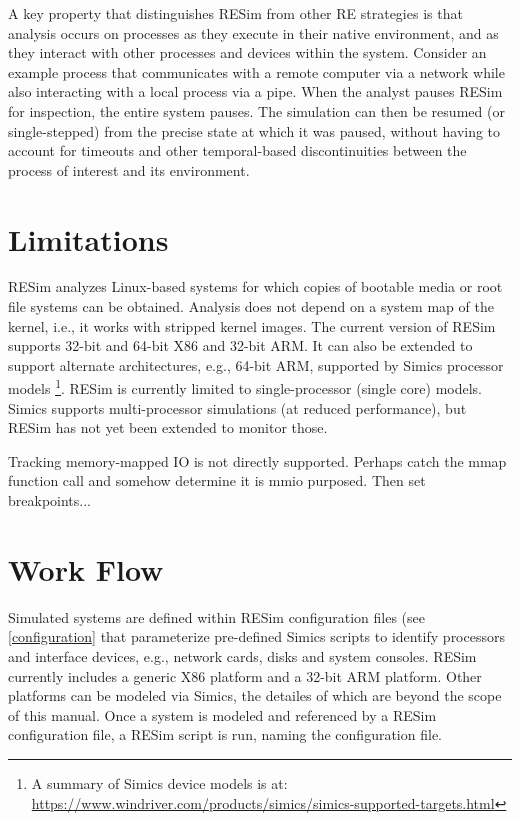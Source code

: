 \documentclass[titlepage]{article}
\begin{document}
A key property that distinguishes RESim from other RE strategies is that analysis occurs on processes as they execute in their native environment, and as they interact with other processes and devices within the system.  Consider an example process that communicates with a remote computer via a network while also interacting with a local process via a pipe.  When the analyst pauses RESim for inspection, the entire system pauses.  The simulation can then be resumed (or single-stepped) from the precise state at which it was paused, without having to account for timeouts and other temporal-based discontinuities between the process of interest and its environment.

\section{Limitations}
RESim analyzes Linux-based systems for which copies of bootable media or root file systems can be obtained.  Analysis does not depend on a system map of the kernel, i.e., it works with stripped kernel images.  The current version of RESim supports 32-bit and 64-bit X86 and 32-bit ARM.  It can also be 
extended to support alternate architectures, e.g., 64-bit ARM, supported by Simics processor models \footnote{A summary of Simics device models is at: \url{https://www.windriver.com/products/simics/simics-supported-targets.html}}.  RESim is currently limited to single-processor (single core) models.  Simics supports
multi-processor simulations (at reduced performance), but RESim has not yet been extended to monitor those.

Tracking memory-mapped IO is not directly supported.  Perhaps catch the mmap function call and somehow determine it is mmio purposed.  Then
set breakpoints...

\section{Work Flow}
Simulated systems are defined within RESim configuration files (see \ref{configuration} that  parameterize pre-defined Simics scripts to identify 
processors and interface devices, e.g., network cards, disks and system consoles.  RESim currently includes a generic X86 platform and
a 32-bit ARM platform. Other platforms can be modeled via Simics, the detailes of which are beyond the scope of this manual.
Once a system is modeled and referenced by a RESim configuration file, a RESim script is run, naming the configuration file.
\end{document}
